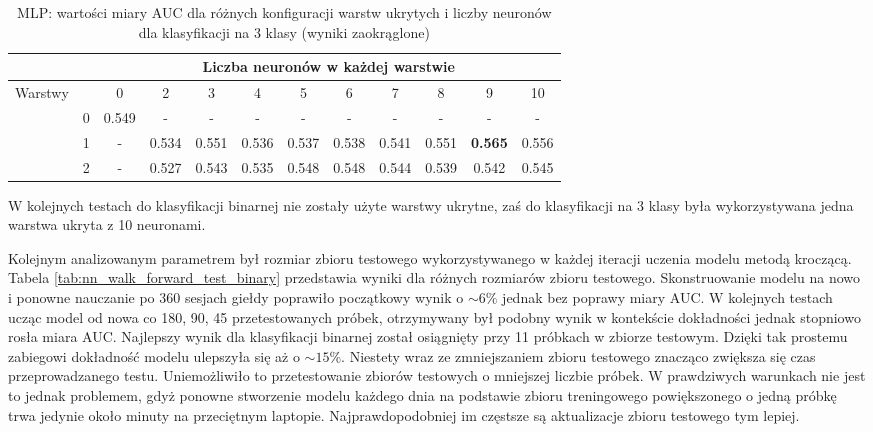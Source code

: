 \documentclass[a4paper, twoside, 11pt, openright]{article}
\begin{document}
\begin{table}[H]
    \centering
    \begin{tabular}{|c|c|c|c|c|c|c|c|c|c|c|c|}
        \hline
         & &  \multicolumn{10}{c|}{Liczba neuronów w każdej warstwie}  \\ \hline
        \multirow{4}{*}{Warstwy} & & 0 & 2 & 3 & 4 & 5 & 6 & 7 & 8 & 9 & 10  \\ \cline{2 - 12}
			& 0 & 0.549 & - & - & - & - & - & - & - & - & - \\ \cline{2 - 12} 
			& 1 & - & 0.534 &  0.551 &  0.536 &  0.537 &  0.538 &  0.541 &  0.551 &  \textbf{0.565} & 0.556 \\ \cline{2 - 12} 
			& 2 & - & 0.527 &   0.543 &   0.535 &   0.548 &   0.548 &   0.544 &   0.539 &   0.542 &   0.545  \\ \cline{2 - 12} \hline

    \end{tabular}
    \caption{MLP: wartości miary AUC dla różnych konfiguracji warstw ukrytych i liczby neuronów dla klasyfikacji na 3 klasy (wyniki zaokrąglone)}
    \label{tab:nn_layers_discrete}
\end{table}

W kolejnych testach do klasyfikacji binarnej nie zostały użyte warstwy ukrytne, zaś do klasyfikacji na 3 klasy była wykorzystywana jedna warstwa ukryta z 10 neuronami.

\bigskip

Kolejnym analizowanym parametrem był rozmiar zbioru testowego wykorzystywanego w każdej iteracji uczenia modelu metodą kroczącą. Tabela \ref{tab:nn_walk_forward_test_binary} przedstawia wyniki dla różnych rozmiarów zbioru testowego. Skonstruowanie modelu na nowo i ponowne nauczanie po 360 sesjach giełdy poprawiło początkowy wynik o $\sim 6\%$ jednak bez poprawy miary AUC. W kolejnych testach ucząc model od nowa co 180, 90, 45 przetestowanych próbek, otrzymywany był podobny wynik w kontekście dokładności jednak stopniowo rosła miara AUC. Najlepszy wynik dla klasyfikacji binarnej został osiągnięty przy 11 próbkach w zbiorze testowym. Dzięki tak prostemu zabiegowi dokładność modelu ulepszyła się aż o $\sim 15\%$. Niestety wraz ze zmniejszaniem zbioru testowego znacząco zwiększa się czas przeprowadzanego testu. Uniemożliwiło to przetestowanie zbiorów testowych o mniejszej liczbie próbek. W prawdziwych warunkach nie jest to jednak problemem, gdyż ponowne stworzenie modelu każdego dnia na podstawie zbioru treningowego powiększonego o jedną próbkę trwa jedynie około minuty na przeciętnym laptopie. Najprawdopodobniej im częstsze są aktualizacje zbioru testowego tym lepiej.
\end{document}
